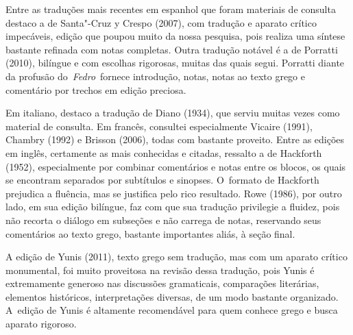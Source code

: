 Entre as traduções mais recentes em espanhol que foram materiais de
consulta destaco a de Santa"-Cruz y Crespo (2007), com tradução e aparato
crítico impecáveis, edição que poupou muito da nossa pesquisa, pois
realiza uma síntese bastante refinada com notas completas. Outra
tradução notável é a de Porratti (2010), bilíngue e com escolhas
rigorosas, muitas das quais segui. Porratti diante da profusão
do~\emph{Fedro}~fornece introdução, notas, notas ao texto grego e
comentário por trechos em edição preciosa.

Em italiano, destaco a tradução de Diano (1934), que serviu muitas vezes
como material de consulta. Em francês, consultei especialmente Vicaire
(1991), Chambry (1992) e Brisson (2006), todas com bastante proveito.
Entre as edições em inglês, certamente as mais conhecidas e citadas,
ressalto a de Hackforth (1952), especialmente por combinar comentários e
notas entre os blocos, os quais se encontram separados por subtítulos e
sinopses. O~formato de Hackforth prejudica a fluência, mas se justifica
pelo rico resultado. Rowe (1986), por outro lado, em sua edição bilíngue,
faz com que sua tradução privilegie a fluidez, pois não recorta o
diálogo em subseções e não carrega de notas, reservando seus comentários
ao texto grego, bastante importantes aliás, à seção final.

A edição de Yunis (2011), texto grego sem tradução, mas com um aparato
crítico monumental, foi muito proveitosa na revisão dessa tradução, pois
Yunis é extremamente generoso nas discussões gramaticais, comparações
literárias, elementos históricos, interpretações diversas, de um modo
bastante organizado. A~edição de Yunis é altamente recomendável para
quem conhece grego e busca aparato rigoroso.

 

